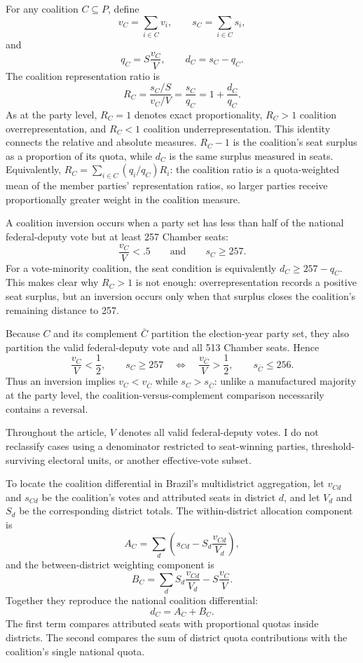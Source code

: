 \documentclass[11pt]{article}
\newcommand{\Parties}{P}
\begin{document}
For any coalition \(C\subseteq\Parties\), define
\[
v_C=\sum_{i\in C}v_i,
\qquad
s_C=\sum_{i\in C}s_i,
\]
and
\[
q_C=S\frac{v_C}{V},
\qquad
d_C=s_C-q_C.
\]
The coalition representation ratio is
\[
R_C=\frac{s_C/S}{v_C/V}
=\frac{s_C}{q_C}
=1+\frac{d_C}{q_C}.
\]
As at the party level, \(R_C=1\) denotes exact proportionality, \(R_C>1\)
coalition overrepresentation, and \(R_C<1\) coalition underrepresentation.
This identity connects the relative and absolute measures. \(R_C-1\) is the
coalition's seat surplus as a proportion of its quota, while \(d_C\) is the
same surplus measured in seats. Equivalently,
\(R_C=\sum_{i\in C}(q_i/q_C)R_i\): the coalition ratio is a quota-weighted mean
of the member parties' representation ratios, so larger parties receive
proportionally greater weight in the coalition measure.

A coalition inversion occurs when a party set has less than half of the
national federal-deputy vote but at least 257 Chamber seats:
\[
\frac{v_C}{V}<.5
\qquad\text{and}\qquad
s_C\geq257.
\]
For a vote-minority coalition, the seat condition is equivalently
\(d_C\geq257-q_C\). This makes clear why \(R_C>1\) is not enough:
overrepresentation records a positive seat surplus, but an inversion occurs
only when that surplus closes the coalition's remaining distance to 257.

Because \(C\) and its complement \(\bar C\) partition the election-year
party set, they also partition the valid federal-deputy vote and all 513
Chamber seats. Hence
\[
\frac{v_C}{V}<\frac{1}{2},\qquad s_C\geq257
\quad\Longleftrightarrow\quad
\frac{v_{\bar C}}{V}>\frac{1}{2},\qquad s_{\bar C}\leq256.
\]
Thus an inversion implies \(v_C<v_{\bar C}\) while
\(s_C>s_{\bar C}\): unlike a manufactured majority at the party level,
the coalition-versus-complement comparison necessarily contains a reversal.

Throughout the article, \(V\) denotes all valid federal-deputy votes. I do
not reclassify cases using a denominator restricted to seat-winning parties,
threshold-surviving electoral units, or another effective-vote subset.


To locate the coalition differential in Brazil's multidistrict aggregation, let
\(v_{Cd}\) and \(s_{Cd}\) be the coalition's votes and attributed seats in
district \(d\), and let \(V_d\) and \(S_d\) be the corresponding district
totals. The within-district allocation component is
\[
A_C=
\sum_d
\left(
s_{Cd}
-
S_d\frac{v_{Cd}}{V_d}
\right),
\]
and the between-district weighting component is
\[
B_C=
\sum_d
S_d\frac{v_{Cd}}{V_d}
-
S\frac{v_C}{V}.
\]
Together they reproduce the national coalition differential:
\[
d_C=A_C+B_C.
\]
The first term compares attributed seats with proportional quotas inside
districts. The second compares the sum of district quota contributions with the
coalition's single national quota.
\end{document}
